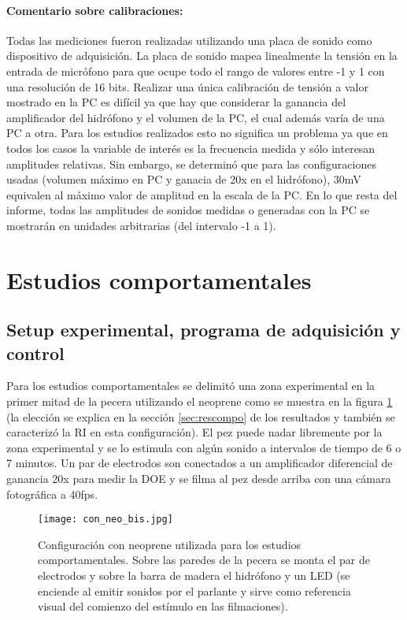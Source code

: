 \paragraph{Comentario sobre calibraciones:}
Todas las mediciones fueron realizadas utilizando una placa de sonido como dispositivo de adquisición. La placa de sonido mapea linealmente la tensión en la entrada de micrófono para que ocupe todo el rango de valores entre -1 y 1 con una resolución de 16 bits. Realizar una única calibración de tensión a valor mostrado en la PC es difícil ya que hay que considerar la ganancia del amplificador del hidrófono y el volumen de la PC, el cual además varía de una PC a otra. Para los estudios realizados esto no significa un problema ya que en todos los casos la variable de interés es la frecuencia medida y sólo interesan amplitudes relativas. Sin embargo, se determinó que para las configuraciones usadas (volumen máximo en PC y ganacia de 20x en el hidrófono), 30mV equivalen al máximo valor de amplitud en la escala de la PC. En lo que resta del informe, todas las amplitudes de sonidos medidas o generadas con la PC se mostrarán en unidades arbitrarias (del intervalo -1 a 1).

\section{Estudios comportamentales}
\subsection{Setup experimental, programa de adquisición y control}
Para los estudios comportamentales se delimitó una zona experimental en la primer mitad de la pecera utilizando el neoprene como se muestra en la figura \ref{fig:conneobis} (la elección se explica en la sección \ref{sec:rescompo} de los resultados y también se caracterizó la RI en esta configuración). El pez puede nadar libremente por la zona experimental y se lo estimula con algún sonido a intervalos de tiempo de 6 o 7 minutos. Un par de electrodos son conectados a un amplificador diferencial de ganancia 20x para medir la DOE y se filma al pez desde arriba con una cámara fotográfica a 40fps.

\begin{figure}[H]
	\centering
		\texttt{[image: con\_neo\_bis.jpg]}
		\caption{Configuración con neoprene utilizada para los estudios comportamentales. Sobre las paredes de la pecera se monta el par de electrodos y sobre la barra de madera el hidrófono y un LED (se enciende al emitir sonidos por el parlante y sirve como referencia visual del comienzo del estímulo en las filmaciones).}
	\label{fig:conneobis}
\end{figure}

